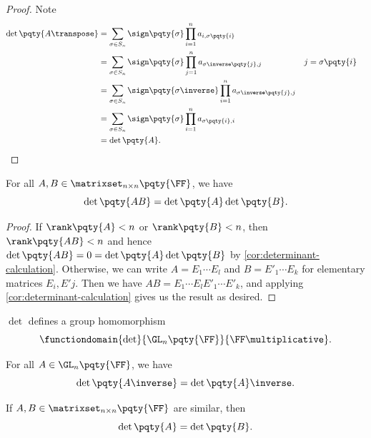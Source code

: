 \begin{proof}
    Note
    \begin{align*}
        \det\pqty{A\transpose} &= \sum_{\sigma \in S_n} \sign\pqty{\sigma} \prod_{i=1}^{n} a_{i, {\sigma\pqty{i}}} \\
        &= \sum_{\sigma \in S_n} \sign\pqty{\sigma} \prod_{j=1}^{n} a_{\sigma\inverse\pqty{j}, j} && j = \sigma\pqty{i} \\
        &= \sum_{\sigma \in S_n} \sign\pqty{\sigma\inverse} \prod_{i=1}^{n} a_{\sigma\inverse\pqty{j}, j} \\
        &= \sum_{\sigma \in S_n} \sign\pqty{\sigma} \prod_{i=1}^{n} a_{\sigma\pqty{i}, i} \\
        &= \det\pqty{A}.
    \end{align*}
\end{proof}

\begin{proposition}
    For all \(A, B \in \matrixset_{n \times n} \pqty{\FF}\), we have
    \[
        \det\pqty{AB} = \det\pqty{A} \det\pqty{B}.
    \]
\end{proposition}

\begin{proof}
    If \(\rank\pqty{A} < n\) or \(\rank\pqty{B} < n\), then \(\rank\pqty{AB} < n\) and hence \(\det\pqty{AB} = 0 = \det\pqty{A} \det\pqty{B}\) by \autoref{cor:determinant-calculation}. Otherwise, we can write \(A = E_1 \cdots E_l\) and \(B = E'_1 \cdots E_k\) for elementary matrices \(E_i, E'j\). Then we have \(AB = E_1 \cdots E_l E'_1 \cdots E'_k\), and applying \autoref{cor:determinant-calculation} gives us the result as desired.
\end{proof}

\begin{corollary}
    \(\det\) defines a group homomorphism
    \[
        \functiondomain{\det}{\GL_n\pqty{\FF}}{\FF\multiplicative}.
    \]
\end{corollary}

\begin{corollary}
    For all \(A \in \GL_n\pqty{\FF}\), we have
    \[
        \det\pqty{A\inverse} = \det\pqty{A}\inverse.
    \]
\end{corollary}

\begin{corollary}
    \label{cor:similar-matrices-same-determinant}%
    If \(A, B \in \matrixset_{n \times n} \pqty{\FF}\) are similar, then
    \[
        \det\pqty{A} = \det\pqty{B}.
    \]
\end{corollary}

